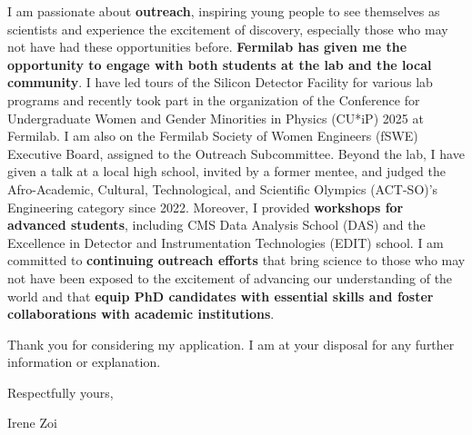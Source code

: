 {\begin{flushleft}


I am passionate about {\bf outreach}, inspiring young people to see themselves as scientists and experience the excitement of discovery, especially those who may not have had these opportunities before. {\bf Fermilab has given me the opportunity to engage with both students at the lab and the local community}. I have led tours of the Silicon Detector Facility for various lab programs and recently took part in the organization of the Conference for Undergraduate Women and Gender Minorities in Physics (CU*iP) 2025 at Fermilab. I am also on the Fermilab Society of Women Engineers (fSWE) Executive Board, assigned to the Outreach Subcommittee. Beyond the lab, I have given a talk at a local high school, invited by a former mentee, and judged the Afro-Academic, Cultural, Technological, and Scientific Olympics (ACT-SO)’s Engineering category since 2022. Moreover, I  provided {\bf workshops for advanced students}, including CMS Data Analysis School (DAS) and the Excellence in Detector and Instrumentation Technologies (EDIT) school. I am committed to {\bf continuing outreach efforts} that bring science to those who may not have been exposed to the excitement of advancing our understanding of the world and that {\bf equip PhD candidates with essential skills and foster collaborations with academic institutions}.


Thank you for considering my application. I am at your disposal for any further information or explanation.

Respectfully yours,

Irene Zoi
\end{flushleft}

}